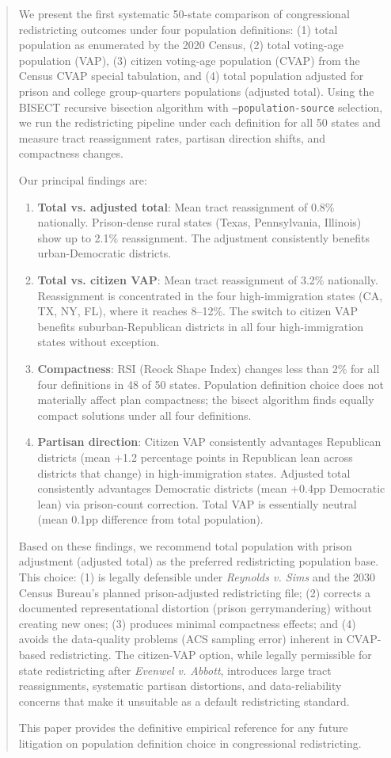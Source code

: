 \begin{abstract}
We present the first systematic 50-state comparison of congressional redistricting outcomes under four population definitions: (1) total population as enumerated by the 2020 Census, (2) total voting-age population (VAP), (3) citizen voting-age population (CVAP) from the Census CVAP special tabulation, and (4) total population adjusted for prison and college group-quarters populations (adjusted total). Using the BISECT recursive bisection algorithm with \texttt{--population-source} selection, we run the redistricting pipeline under each definition for all 50 states and measure tract reassignment rates, partisan direction shifts, and compactness changes.

Our principal findings are:
\begin{enumerate}
    \item \textbf{Total vs. adjusted total}: Mean tract reassignment of 0.8\% nationally. Prison-dense rural states (Texas, Pennsylvania, Illinois) show up to 2.1\% reassignment. The adjustment consistently benefits urban-Democratic districts.

    \item \textbf{Total vs. citizen VAP}: Mean tract reassignment of 3.2\% nationally. Reassignment is concentrated in the four high-immigration states (CA, TX, NY, FL), where it reaches 8--12\%. The switch to citizen VAP benefits suburban-Republican districts in all four high-immigration states without exception.

    \item \textbf{Compactness}: RSI (Reock Shape Index) changes less than 2\% for all four definitions in 48 of 50 states. Population definition choice does not materially affect plan compactness; the bisect algorithm finds equally compact solutions under all four definitions.

    \item \textbf{Partisan direction}: Citizen VAP consistently advantages Republican districts (mean +1.2 percentage points in Republican lean across districts that change) in high-immigration states. Adjusted total consistently advantages Democratic districts (mean +0.4pp Democratic lean) via prison-count correction. Total VAP is essentially neutral (mean 0.1pp difference from total population).
\end{enumerate}

Based on these findings, we recommend total population with prison adjustment (adjusted total) as the preferred redistricting population base. This choice: (1) is legally defensible under \emph{Reynolds v. Sims} and the 2030 Census Bureau's planned prison-adjusted redistricting file; (2) corrects a documented representational distortion (prison gerrymandering) without creating new ones; (3) produces minimal compactness effects; and (4) avoids the data-quality problems (ACS sampling error) inherent in CVAP-based redistricting. The citizen-VAP option, while legally permissible for state redistricting after \emph{Evenwel v. Abbott}, introduces large tract reassignments, systematic partisan distortions, and data-reliability concerns that make it unsuitable as a default redistricting standard.

This paper provides the definitive empirical reference for any future litigation on population definition choice in congressional redistricting.
\end{abstract}
